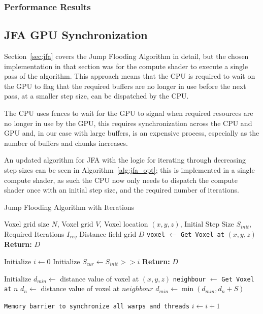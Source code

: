 \subsubsection{Performance Results}

\subsection{JFA GPU Synchronization}
Section~\ref{sec:jfa} covers the Jump Flooding Algorithm in detail, but the chosen implementation in that section was for
the compute shader to execute a single pass of the algorithm. This approach means that the CPU is required to wait on the
GPU to flag that the required buffers are no longer in use before the next pass, at a smaller step size, can be
dispatched by the CPU.

The CPU uses fences to wait for the GPU to signal when required resources are no longer in use by the GPU, this requires
synchronization across the CPU and GPU and, in our case with large buffers, is an expensive process, especially as the
number of buffers and chunks increases.

An updated algorithm for JFA with the logic for iterating through decreasing step sizes can be seen in
Algorithm~\ref{alg:jfa_opt}; this is implemented in a single compute shader, as such the CPU now only needs to dispatch
the compute shader once with an initial step size, and the required number of iterations.

\begin{algorithm}[H]
    \caption{Jump Flooding Algorithm with Iterations}
    \label{alg:jfa_opt}
    \begin{algorithmic}[1]
        \REQUIRE Voxel grid size \(N\), Voxel grid \(V\), Voxel location \((x, y, z)\), Initial Step Size \(S_{init}\),
        Required Iterations \(I_{req}\)
        \ENSURE Distance field grid \(D\)
        \STATE \texttt{voxel} $\gets$ \texttt{Get Voxel at} \((x, y, z)\)
        \STATE \textbf{Return:} \(D\)
        \ENDIF

        \STATE Initialize $i \gets 0$
        \STATE Initialize $S_{cur} \gets S_{init} >> i$
        \STATE \textbf{Return:} \(D\)
        \ENDIF

        \STATE Initialize $d_{min} \gets$ distance value of voxel at \((x, y, z)\)
        \STATE \texttt{neighbour} $\gets$ \texttt{Get Voxel at} $n$
        \STATE $d_{n} \gets$ distance value of voxel at $neighbour$
        \STATE $d_{min} \gets \min(d_{min}, d_n + S)$
        \ENDFOR

        \STATE \texttt{Memory barrier to synchronize all warps and threads}
        \STATE $i \gets i + 1$
        \ENDFOR
    \end{algorithmic}
\end{algorithm}

